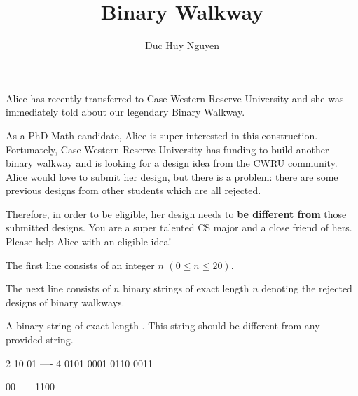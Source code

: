 \documentclass{article}
\title{Binary Walkway}
\author{Duc Huy Nguyen}
\begin{document}
\begin{problemDescription}

Alice has recently transferred to Case Western Reserve University and she was immediately told about our legendary Binary Walkway.

As a PhD Math candidate, Alice is super interested in this construction. Fortunately, Case Western Reserve University has funding to build another binary walkway and is looking for a design idea from the CWRU community. Alice would love to submit her design, but there is a problem: there are some previous designs from other students which are all rejected.

Therefore, in order to be eligible, her design needs to \textbf{be different from} those submitted designs. You are a super talented CS major and a close friend of hers. Please help Alice with an eligible idea!
    

\end{problemDescription}

\begin{inputDescription}

    The first line consists of an integer $n$ $(0 \leq n \leq 20)$.

    The next line consists of $n$ binary strings of exact length $n$ denoting the rejected designs of binary walkways.
    

\end{inputDescription}

\begin{outputDescription}
A binary string of exact length . This string should be different from any provided string.
\end{outputDescription}

\begin{sampleInput}
2
10
01
----
4
0101
0001
0110
0011
\end{sampleInput}
\begin{sampleOutput}
00
----
1100
\end{sampleOutput}
\end{document}
